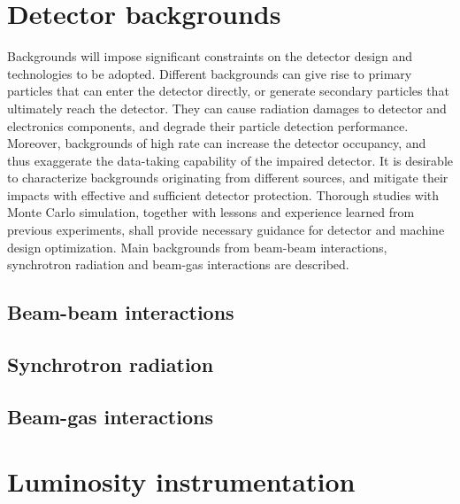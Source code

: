 \section{Detector backgrounds}
Backgrounds will impose significant constraints on the detector design and technologies to be adopted. Different backgrounds can give rise to primary particles that can enter the detector directly, or generate secondary particles that ultimately reach the detector. They can cause radiation damages to detector and electronics components, and degrade their particle detection performance. Moreover, backgrounds of high rate can increase the detector occupancy, and thus exaggerate the data-taking capability of the impaired detector. It is desirable to characterize backgrounds originating from different sources, and mitigate their impacts with effective and sufficient detector protection. Thorough studies with Monte Carlo simulation, together with lessons and experience learned from previous experiments, shall provide necessary guidance for detector and machine design optimization. Main backgrounds from beam-beam interactions, synchrotron radiation and beam-gas interactions are described.

\subsection{Beam-beam interactions}

\subsection{Synchrotron radiation}

\subsection{Beam-gas interactions}

\section{Luminosity instrumentation}
\label{sec:LumiCal}

